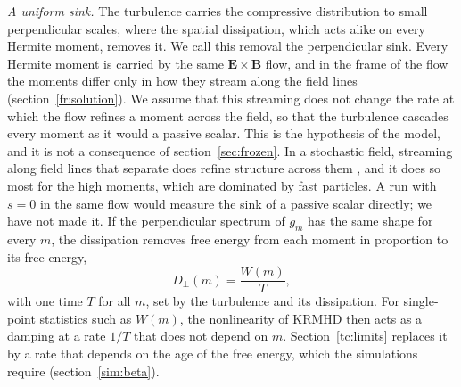 \emph{A uniform sink.} The turbulence carries the compressive distribution to small perpendicular scales, where the spatial dissipation, which acts alike on every Hermite moment, removes it. We call this removal the perpendicular sink. Every Hermite moment is carried by the same $\boldsymbol E\times\boldsymbol B$ flow, and in the frame of the flow the moments differ only in how they stream along the field lines (section~\ref{fr:solution}). We assume that this streaming does not change the rate at which the flow refines a moment across the field, so that the turbulence cascades every moment as it would a passive scalar. This is the hypothesis of the model, and it is not a consequence of section~\ref{sec:frozen}. In a stochastic field, streaming along field lines that separate does refine structure across them \citep{RechesterRosenbluth1978}, and it does so most for the high moments, which are dominated by fast particles. A run with $s=0$ in the same flow would measure the sink of a passive scalar directly; we have not made it.
 If the perpendicular spectrum of $g_m$ has the same shape for every $m$, the dissipation removes free energy from each moment in proportion to its free energy,
\begin{equation}\label{eq:uniformsink}
  D_\perp(m)=\frac{W(m)}{T},
\end{equation}
with one time $T$ for all $m$, set by the turbulence and its dissipation. For single-point statistics such as $W(m)$, the nonlinearity of KRMHD then acts as a damping at a rate $1/T$ that does not depend on $m$. Section~\ref{tc:limits} replaces it by a rate that depends on the age of the free energy, which the simulations require (section~\ref{sim:beta}).

